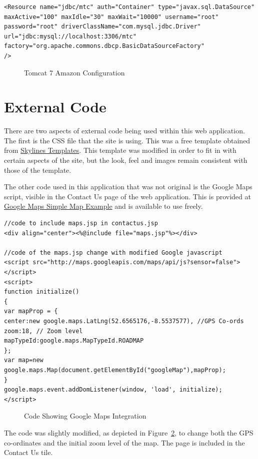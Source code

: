 \begin{lstlisting}
<Resource name="jdbc/mtc" auth="Container" type="javax.sql.DataSource"
maxActive="100" maxIdle="30" maxWait="10000" username="root"
password="root" driverClassName="com.mysql.jdbc.Driver"
url="jdbc:mysql://localhost:3306/mtc"
factory="org.apache.commons.dbcp.BasicDataSourceFactory"
/>

\end{lstlisting}
\begin{figure}[H]
\caption{Tomcat 7 Amazon Configuration}
\label{fig:tomcatconfig}
\end{figure}

\section{External Code}
There are two aspects of external code being used within this web application. The first is the CSS file that the site is using. This was a free template obtained from \href{http://skylinestemplates.blogspot.ie/2011/11/greefies-solution-xhtml-and-css.html}{Skylines Templates}. This template was modified in order to fit in with certain aspects of the site, but the look, feel and images remain consistent with those of the template.

The other code used in this application that was not original is the Google Maps script, visible in the Contact Us page of the web application. This is provided at \href{https://developers.google.com/maps/documentation/javascript/examples/map-simple}{Google Maps Simple Map Example} and is available to use freely. 

\begin{lstlisting}
//code to include maps.jsp in contactus.jsp
<div align="center"><%@include file="maps.jsp"%></div>

//code of the maps.jsp change with modified Google javascript
<script src="http://maps.googleapis.com/maps/api/js?sensor=false">
</script>
<script>
function initialize()
{
var mapProp = {
center:new google.maps.LatLng(52.6565176,-8.5537577), //GPS Co-ords
zoom:18, // Zoom level
mapTypeId:google.maps.MapTypeId.ROADMAP
};
var map=new google.maps.Map(document.getElementById("googleMap"),mapProp);
}
google.maps.event.addDomListener(window, 'load', initialize);
</script>

\end{lstlisting}
\begin{figure}[H]
\caption{Code Showing Google Maps Integration}
\label{fig:googlemaps}
\end{figure}

The code was slightly modified, as depicted in Figure~\ref{fig:googlemaps}, to change both the GPS co-ordinates and the initial zoom level of the map. The page is included in the Contact Us tile.\newline
